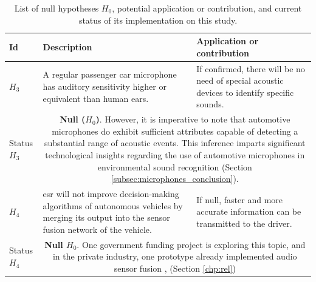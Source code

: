 \begin{table}[ht!]
    \caption[List of null hypotheses $H_0$ defined during the study development ]{List of null hypotheses $H_0$, potential application or contribution, and current status of its implementation on this study.}
    \label{table:hypotheses_list_h0}
    \centering
    \begin{tabular}{p{1.7cm}|p{6.5cm}|p{6.5cm}}
        \Xhline{2\arrayrulewidth} 
        \rowcolor{lightgray}
        \textbf{Id} & \textbf{Description} & \textbf{Application or contribution} \\
        \hline
        $H_3$ &
        A regular passenger car microphone has auditory sensitivity higher or equivalent than human ears. &
        If confirmed, there will be no need of special acoustic devices to identify specific sounds. \\
        \hline
        \rowcolor{gray!20} Status $H_3$ & \multicolumn{2}{c}{\parbox{13.4cm}{\textbf{Null ($H_0$)}. However, it is imperative to note that automotive microphones do exhibit sufficient attributes capable of detecting a substantial range of acoustic events. This inference imparts significant technological insights regarding the use of automotive microphones in environmental sound recognition (Section \ref{subsec:microphones_conclusion}).}} \\
        \hline \hline
        $H_4$ & 
        \gls{esr} will not improve decision-making algorithms of autonomous vehicles by merging its output into the sensor fusion network of the vehicle. & 
        If null, faster and more accurate information can be transmitted to the driver. \\
        \hline
        \rowcolor{gray!20} Status $H_4$ & \multicolumn{2}{c}{\parbox{13.4cm}{\textbf{Null $H_0$}. One government funding project \cite{ISPOT2020} is exploring this topic, and in the private industry, one prototype already implemented audio sensor fusion \cite{WAYMO2023}, (Section \ref{chp:rel})}} \\        
        \hline \hline

\end{tabular}
\end{table}
